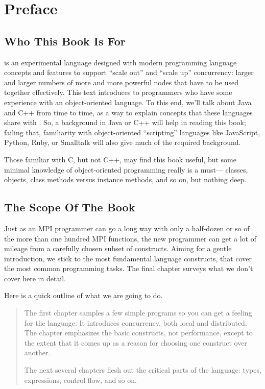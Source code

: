 \chapter*{Preface}
\section*{Who This Book Is For}
\Xten{} is an experimental language designed with modern programming language
concepts and features to support ``scale out'' and ``scale up'' concurrency:
larger and larger numbers of more and more powerful nodes that have to be used
together effectively. This text introduces \Xten{} to programmers who have some
experience with an object-oriented language.  To this end, we'll talk about Java and C++
from time to time, as a way to explain concepts that these languages share with
\Xten{}.   So, a background in Java or C++ will help in reading this book; failing that, 
familiarity with object-oriented ``scripting'' languages like JavaScript, Python, Ruby, or
Smalltalk will also give much of the required background.

Those familiar with C, but not C++, may find this book useful,
but some minimal knowledge of object-oriented programming really is a must---\eg{}
classes, objects, class methods versus instance methods, and so on, but nothing deep. 

\section*{The Scope Of The Book}
Just as an MPI programmer can go a long way with only a
half-dozen or so of the more than one hundred MPI functions, 
the new \Xten{} programmer can get a lot of mileage from a carefully
chosen subset of  \Xten{}  constructs.  Aiming for a gentle introduction,
we stick to the most fundamental language constructs, that cover the most
common programming tasks.  The final chapter surveys what we don't cover here 
in detail.

Here is a quick outline of what we are going to do.
\begin{quote}
The first chapter samples a  few simple \Xten{} programs so you can get a feeling for the
language.   It introduces concurrency, both local and distributed.  The
chapter emphasizes the basic constructs, not performance, except to the
extent that  it comes up as a reason for choosing one construct over another.
 
The next several chapters flesh out the critical parts of the language:
types, expressions, control flow, and so on.  

\end{quote}

